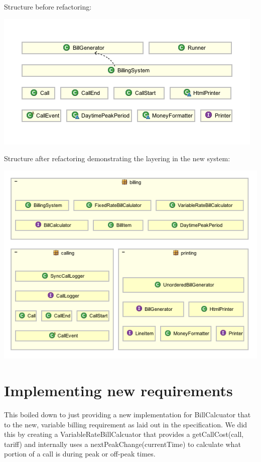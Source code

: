 \documentclass[a4paper,11pt]{article}
\begin{document}
Structure before refactoring:
\begin{center}
\includegraphics[scale=0.75]{images/original_structure.png}
\end{center}

Structure after refactoring demonstrating the layering in the new system:
\begin{center}
\includegraphics[scale=0.75]{images/new_structure.png}
\end{center}

\section{Implementing new requirements}
This boiled down to just providing a new implementation for BillCalcuator that to the new, variable billing requirement as laid out in the specification. We did this by creating a VariableRateBillCalcuator that provides a getCallCost(call, tariff) and internally uses a nextPeakChange(currentTime) to calculate what portion of a call is during peak or off-peak times.
\end{document}
